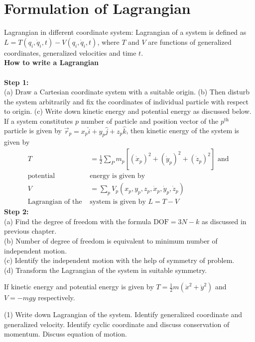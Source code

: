 \section{Formulation of Lagrangian}
Lagrangian in different coordinate system:
Lagrangian of a system is defined as $L=T\left(q_{i}, \dot{q}_{i}, t\right)-V\left(q_{i}, \dot{q}_{i}, t\right)$, where $T$ and $V$ are functions of generalized coordinates, generalized velocities and time $t$.\\
\textbf{How to write a Lagrangian}\\\\
\textbf{Step 1:}\\
(a) Draw a Cartesian coordinate system with a suitable origin.
(b) Then disturb the system arbitrarily and fix the coordinates of individual particle with respect to origin.
(c) Write down kinetic energy and potential energy as discussed below.
If a system constitutes $p$ number of particle and position vector of the $p^{\text {th }}$ particle is given by $\vec{r}_{p}=x_{p} \hat{i}+y_{p} \hat{j}+z_{p} \hat{k}$, then kinetic energy of the system is given by
\begin{align*}
T&=\frac{1}{2} \sum_{P} m_{p}\left[\left(\dot{x}_{p}\right)^{2}+\left(\dot{y}_{p}\right)^{2}+\left(\dot{z}_{p}\right)^{2}\right] \text { and }\\
\text{potential }&\text{energy is given by}\\
V&=\sum_{p} V_{p}\left(x_{p}, y_{p}, z_{p}, \dot{x}_{p}, \dot{y}_{p}, \dot{z}_{p}\right)\\
\text{Lagrangian of the  }&\text{system is given by }L=T-V
\end{align*}
\textbf{Step 2:}\\
(a) Find the degree of freedom with the formula $\mathrm{DOF}=3 N-k$ as discussed in previous chapter.\\
(b) Number of degree of freedom is equivalent to minimum number of independent motion.\\
(c) Identify the independent motion with the help of symmetry of problem.\\
(d) Transform the Lagrangian of the system in suitable symmetry.\\
\begin{exercise}
If kinetic energy and potential energy is given by $T=\frac{1}{2} m\left(\dot{x}^{2}+\dot{y}^{2}\right)$ and $V=-m g y$ respectively.
	 \begin{tasks}(1)
		\task[\textbf{a.}] Write down Lagrangian of the system.
		\task[\textbf{b.}] Identify generalized coordinate and generalized velocity.
		\task[\textbf{c.}] Identify cyclic coordinate and discuss conservation of momentum.
		\task[\textbf{d.}]  Discuss equation of motion.
	\end{tasks}
\end{exercise}

